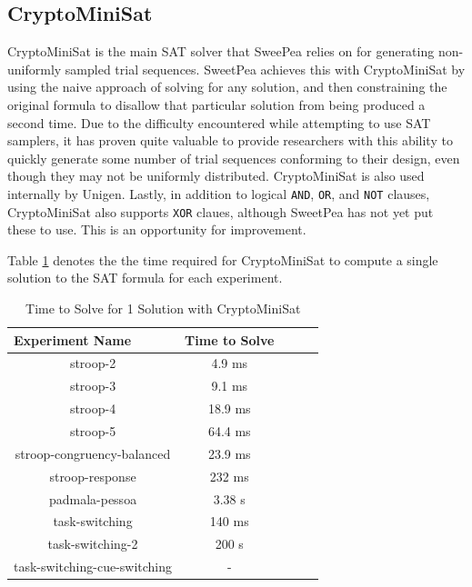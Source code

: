\begin{verbatim}

\end{verbatim}


\subsection{CryptoMiniSat}

CryptoMiniSat \cite{DBLP:conf/sat/SoosNC09,DBLP:conf/sat/2009} is the main SAT solver that SweePea relies on for generating non-uniformly sampled trial sequences. SweetPea achieves this with CryptoMiniSat by using the naive approach of solving for any solution, and then constraining the original formula to disallow that particular solution from being produced a second time. Due to the difficulty encountered while attempting to use SAT samplers, it has proven quite valuable to provide researchers with this ability to quickly generate some number of trial sequences conforming to their design, even though they may not be uniformly distributed. CryptoMiniSat is also used internally by Unigen. Lastly, in addition to logical \texttt{AND}, \texttt{OR}, and \texttt{NOT} clauses, CryptoMiniSat also supports \texttt{XOR} claues, although SweetPea has not yet put these to use. This is an opportunity for improvement.


Table \ref{tab:benchmark_experiments_cmsat} denotes the the time required for CryptoMiniSat to compute a single solution to the SAT formula for each experiment.


\begin{table}
  \centering
  \caption{Time to Solve for 1 Solution with CryptoMiniSat}
\begin{tabular}{|c|c|c|c|c|}
\hline
\multicolumn{1}{|l|}{Experiment Name} & Time to Solve   \\ \hline
stroop-2                              & 4.9 ms          \\ \hline
stroop-3                              & 9.1 ms          \\ \hline
stroop-4                              & 18.9 ms         \\ \hline
stroop-5                              & 64.4 ms         \\ \hline
stroop-congruency-balanced            & 23.9 ms         \\ \hline
stroop-response                       & 232 ms          \\ \hline
padmala-pessoa                        & 3.38 s          \\ \hline
task-switching                        & 140 ms          \\ \hline
task-switching-2                      & 200 s           \\ \hline
task-switching-cue-switching          & -               \\ \hline
\end{tabular}
\label{tab:benchmark_experiments_cmsat}%
\end{table}


